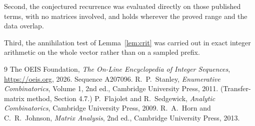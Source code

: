 \documentclass[11pt,a4paper]{article}
\theoremstyle{plain}
\theoremstyle{definition}
\begin{document}
Second, the conjectured recurrence was evaluated directly on those published terms, with no
matrices involved, and holds wherever the proved range and the data overlap.

Third, the annihilation test of Lemma~\ref{lem:crit} was carried out in exact integer
arithmetic on the whole vector rather than on a sampled prefix.

\begin{thebibliography}{9}
 The OEIS Foundation, \emph{The On-Line Encyclopedia of Integer
Sequences}, \url{https://oeis.org}, 2026. Sequence A207096.
 R.~P.~Stanley, \emph{Enumerative Combinatorics}, Volume 1, 2nd ed.,
Cambridge University Press, 2011. (Transfer-matrix method, Section 4.7.)
 P.~Flajolet and R.~Sedgewick, \emph{Analytic Combinatorics}, Cambridge
University Press, 2009.
 R.~A.~Horn and C.~R.~Johnson, \emph{Matrix Analysis}, 2nd ed., Cambridge
University Press, 2013.
\end{thebibliography}
\end{document}
